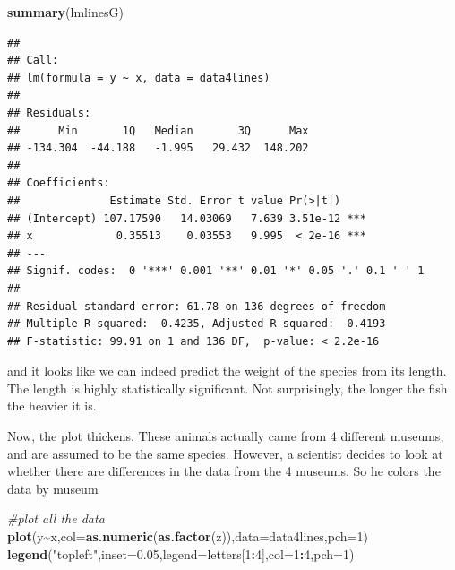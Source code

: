 \documentclass[
]{book}
\newenvironment{Shaded}{\begin{snugshade}}{\end{snugshade}}
\newcommand{\AttributeTok}[1]{\textcolor[rgb]{0.13,0.29,0.53}{#1}}
\newcommand{\CommentTok}[1]{\textcolor[rgb]{0.56,0.35,0.01}{\textit{#1}}}
\newcommand{\DecValTok}[1]{\textcolor[rgb]{0.00,0.00,0.81}{#1}}
\newcommand{\FloatTok}[1]{\textcolor[rgb]{0.00,0.00,0.81}{#1}}
\newcommand{\FunctionTok}[1]{\textcolor[rgb]{0.13,0.29,0.53}{\textbf{#1}}}
\newcommand{\NormalTok}[1]{#1}
\newcommand{\SpecialCharTok}[1]{\textcolor[rgb]{0.81,0.36,0.00}{\textbf{#1}}}
\newcommand{\StringTok}[1]{\textcolor[rgb]{0.31,0.60,0.02}{#1}}
\begin{document}
\begin{Shaded}
\begin{Highlighting}[]
\FunctionTok{summary}\NormalTok{(lmlinesG)}
\end{Highlighting}
\end{Shaded}

\begin{verbatim}
## 
## Call:
## lm(formula = y ~ x, data = data4lines)
## 
## Residuals:
##      Min       1Q   Median       3Q      Max 
## -134.304  -44.188   -1.995   29.432  148.202 
## 
## Coefficients:
##              Estimate Std. Error t value Pr(>|t|)    
## (Intercept) 107.17590   14.03069   7.639 3.51e-12 ***
## x             0.35513    0.03553   9.995  < 2e-16 ***
## ---
## Signif. codes:  0 '***' 0.001 '**' 0.01 '*' 0.05 '.' 0.1 ' ' 1
## 
## Residual standard error: 61.78 on 136 degrees of freedom
## Multiple R-squared:  0.4235, Adjusted R-squared:  0.4193 
## F-statistic: 99.91 on 1 and 136 DF,  p-value: < 2.2e-16
\end{verbatim}

and it looks like we can indeed predict the weight of the species from its length. The length is highly statistically significant. Not surprisingly, the longer the fish the heavier it is.

Now, the plot thickens. These animals actually came from 4 different museums, and are assumed to be the same species. However, a scientist decides to look at whether there are differences in the data from the 4 museums. So he colors the data by museum

\begin{Shaded}
\begin{Highlighting}[]
\CommentTok{\#plot all the data}
\FunctionTok{plot}\NormalTok{(y}\SpecialCharTok{\textasciitilde{}}\NormalTok{x,}\AttributeTok{col=}\FunctionTok{as.numeric}\NormalTok{(}\FunctionTok{as.factor}\NormalTok{(z)),}\AttributeTok{data=}\NormalTok{data4lines,}\AttributeTok{pch=}\DecValTok{1}\NormalTok{)}
\FunctionTok{legend}\NormalTok{(}\StringTok{"topleft"}\NormalTok{,}\AttributeTok{inset=}\FloatTok{0.05}\NormalTok{,}\AttributeTok{legend=}\NormalTok{letters[}\DecValTok{1}\SpecialCharTok{:}\DecValTok{4}\NormalTok{],}\AttributeTok{col=}\DecValTok{1}\SpecialCharTok{:}\DecValTok{4}\NormalTok{,}\AttributeTok{pch=}\DecValTok{1}\NormalTok{)}
\end{Highlighting}
\end{Shaded}
\end{document}
